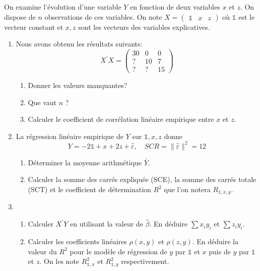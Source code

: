\documentclass{td_um}
\providecommand{\1}{\mathds{1}}
\begin{document}
\exo{} On examine l'évolution d'une variable $Y$ en fonction de deux variables $x$ et $z$. On dispose de $n$ observations de ces variables. On note $X=\begin{pmatrix}\1 & x & z\end{pmatrix}$ où $\1$ est le vecteur constant et $x, z$ sont les vecteurs des variables explicatives.
\begin{enumerate}
    \item Nous avons obtenu les résultats suivants:
        $$
        X^{\prime} X=\begin{pmatrix}
                30 & 0 & 0 \\
                ? & 10 & 7 \\
                ? & ? & 15
        \end{pmatrix}
        $$
        \begin{enumerate}
            \item  Donner les valeurs manquantes?
            \item  Que vaut $n$ ?
            \item  Calculer le coefficient de corrélation linéaire empirique entre $x$ et $z$.
        \end{enumerate}
    \item  La régression linéaire empirique de $Y$ sur $\1 , x, z$ donne
        $$
        Y=-2 \1 +x+2 z+\hat{\varepsilon}, \quad S C R=\|\hat{\varepsilon}\|^{2}=12
        $$
        \begin{enumerate}
            \item Déterminer la moyenne arithmétique $\bar{Y}$.
            \item Calculer la somme des carrés expliquée (SCE), la somme des carrés totale (SCT) et le coefficient de détermination $R^{2}$ que l'on notera $R_{\1,x,y}$.
        \end{enumerate}
    \item 
        \begin{enumerate}
            \item Calculer $X^{\prime} Y$ en utilisant la valeur de $\hat{\beta}$. En déduire $\sum x_{i} y_{i}$ et $\sum z_{i} y_{i}$.
            \item Calculer les coefficients linéaires $\rho(x, y)$ et $\rho(z, y)$. En déduire la valeur du $R^{2}$ pour le modèle de régression de $y$ par $\1 $ et $x$ puis de $y$ par $\1 $ et $z$. On les note $R^2_{\1,x}$ et $R^2_{\1,y}$ respectivement.
        \end{enumerate}
\end{enumerate}
\end{document}

